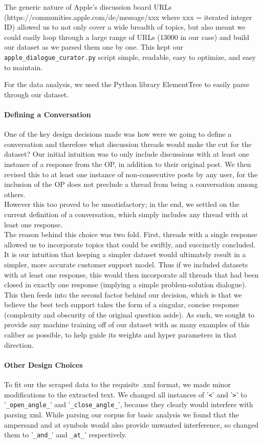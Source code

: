 \documentclass[10pt]{article}
\begin{document}
\begin{multicols}{2}
The generic nature of Apple's discussion board URLs (https://communities.apple.com/de/message/xxx where xxx = iterated integer ID) allowed us to not only cover a wide breadth of topics, but also meant we could easily loop through a large range of URLs (13000 in our case) and build our dataset as we parsed them one by one. This kept our \texttt{apple\_dialogue\_curator.py} script simple, readable, easy to optimize, and easy to maintain.

For the data analysis, we used the Python library ElementTree to easily parse through our dataset.

\paragraph{Defining a Conversation}
One of the key design decisions made was how were we going to define a conversation and therefore what discussion threads would make the cut for the dataset? Our initial intuition was to only include discussions with at least one instance of a response from the OP, in addition to their original post. We then revised this to at least one instance of non-consecutive posts by any user, for the inclusion of the OP does not preclude a thread from being a conversation among others.\\

However this too proved to be unsatisfactory; in the end, we settled on the current definition of a conversation, which simply includes any thread with at least one response.\\

The reason behind this choice was two fold. First, threads with a single response allowed us to incorporate topics that could be swiftly, and succinctly concluded. It is our intuition that keeping a simpler dataset would ultimately result in a simpler, more accurate customer support model. Thus if we included datasets with at least one response, this would then incorporate all threads that had been closed in exactly one response (implying a simple problem-solution dialogue). This then feeds into the second factor behind our decision, which is that we believe the best tech support takes the form of a singular, concise response (complexity and obscurity of the original question aside). As such, we sought to provide any machine training off of our dataset with as many examples of this caliber as possible, to help guide its weights and hyper parameters in that direction.

\paragraph{Other Design Choices}
To fit our the scraped data to the requisite .xml format, we made minor modifications to the extracted text. We changed all instances of '\texttt{<}' and '\texttt{>}' to '\texttt{\_open\_angle\_}' and '\texttt{\_close\_angle\_}', because they clearly would interfere with parsing xml. While parsing our corpus for basic analysis we found that the ampersand and at symbols would also provide unwanted interference, so changed them to '\texttt{\_and\_}' and \texttt{\_at\_}' respectively.


\end{multicols}
\end{document}
